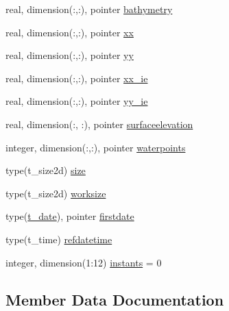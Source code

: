 \begin{DoxyCompactItemize}
\item 
real, dimension(\+:,\+:), pointer \mbox{\hyperlink{structmodulemog2dformat_1_1t__mog2dformat_a95bc55cdbf6c42da99edf74262432377}{bathymetry}}
\item 
real, dimension(\+:,\+:), pointer \mbox{\hyperlink{structmodulemog2dformat_1_1t__mog2dformat_acd4e9451763f135de47c30e8ac6bb9d0}{xx}}
\item 
real, dimension(\+:,\+:), pointer \mbox{\hyperlink{structmodulemog2dformat_1_1t__mog2dformat_a43234fb8bcf6093fc4b08c8940623e58}{yy}}
\item 
real, dimension(\+:,\+:), pointer \mbox{\hyperlink{structmodulemog2dformat_1_1t__mog2dformat_a577d71c4c66cd7514a7a01da25b31bf7}{xx\+\_\+ie}}
\item 
real, dimension(\+:,\+:), pointer \mbox{\hyperlink{structmodulemog2dformat_1_1t__mog2dformat_a41248acfb8ab70e112639fdb58b0b4c4}{yy\+\_\+ie}}
\item 
real, dimension(\+:, \+:), pointer \mbox{\hyperlink{structmodulemog2dformat_1_1t__mog2dformat_aadac8f0e7f7ce10f1e734318063724b6}{surfaceelevation}}
\item 
integer, dimension(\+:,\+:), pointer \mbox{\hyperlink{structmodulemog2dformat_1_1t__mog2dformat_ae8a75d044801755fd2c1a131d02d3b5e}{waterpoints}}
\item 
type(t\+\_\+size2d) \mbox{\hyperlink{structmodulemog2dformat_1_1t__mog2dformat_a2ca5ed552f89ecd5e29ccfe57a21afb4}{size}}
\item 
type(t\+\_\+size2d) \mbox{\hyperlink{structmodulemog2dformat_1_1t__mog2dformat_ac5b1bd41c886cbeebf416479db6cd94f}{worksize}}
\item 
type(\mbox{\hyperlink{structmodulemog2dformat_1_1t__date}{t\+\_\+date}}), pointer \mbox{\hyperlink{structmodulemog2dformat_1_1t__mog2dformat_a673f719e19b82a99a97fd46ba51e0f60}{firstdate}}
\item 
type(t\+\_\+time) \mbox{\hyperlink{structmodulemog2dformat_1_1t__mog2dformat_af082bb3df9aab44994a2855b228fbd7d}{refdatetime}}
\item 
integer, dimension(1\+:12) \mbox{\hyperlink{structmodulemog2dformat_1_1t__mog2dformat_a7a49ef2e48fa826d147c26ca8471c2c3}{instants}} = 0
\end{DoxyCompactItemize}


\subsection{Member Data Documentation}
\mbox{\label{structmodulemog2dformat_1_1t__mog2dformat_a95bc55cdbf6c42da99edf74262432377}} 
